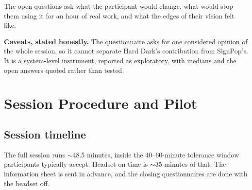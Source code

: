 The open questions ask what the participant would change, what would stop them using it for an hour
of real work, and what the edges of their vision felt like.

\textbf{Caveats, stated honestly.} The questionnaire asks for one considered opinion of the whole
session, so it cannot separate Hard Dark's contribution from SignPop's. It is a system-level
instrument, reported as exploratory, with medians and the open answers quoted rather than tested.

\section{Session Procedure and Pilot}

\subsection{Session timeline}

The full session runs $\sim$48.5 minutes, inside the 40–60-minute tolerance window participants
typically accept. Headset-on time is $\sim$35 minutes of that. The information sheet is sent in
advance, and the closing questionnaires are done with the headset off.

